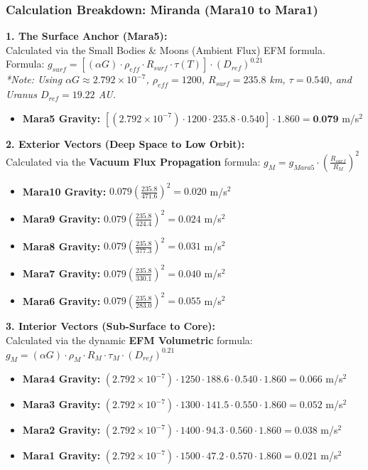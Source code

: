 \documentclass[11pt, a4paper]{article}
\begin{document}
\clearpage
\subsubsection{Calculation Breakdown: Miranda (Mara10 to Mara1)}

\noindent \textbf{1. The Surface Anchor (Mara5):} \\
Calculated via the Small Bodies \& Moons (Ambient Flux) EFM formula. \\
Formula: $g_{surf} = \left[ (\alpha G) \cdot \rho_{eff} \cdot R_{surf} \cdot \tau(T) \right] \cdot (D_{ref})^{0.21}$ \\
\textit{*Note: Using $\alpha G \approx 2.792 \times 10^{-7}$, $\rho_{eff} = 1200$, $R_{surf} = 235.8$ km, $\tau = 0.540$, and Uranus $D_{ref} = 19.22$ AU.}
\begin{itemize}
  \item \textbf{Mara5 Gravity:} $\left[ (2.792 \times 10^{-7}) \cdot 1200 \cdot 235.8 \cdot 0.540 \right] \cdot 1.860 = \textbf{0.079}$ m/s$^2$
\end{itemize}

\vspace{0.5em}
\noindent \textbf{2. Exterior Vectors (Deep Space to Low Orbit):} \\
Calculated via the \textbf{Vacuum Flux Propagation} formula: $g_M = g_{Mara5} \cdot \left( \frac{R_{surf}}{R_M} \right)^2$
\begin{itemize}
  \item \textbf{Mara10 Gravity:} $0.079 \left( \frac{235.8}{471.6} \right)^2 = 0.020$ m/s$^2$
  \item \textbf{Mara9 Gravity:} $0.079 \left( \frac{235.8}{424.4} \right)^2 = 0.024$ m/s$^2$
  \item \textbf{Mara8 Gravity:} $0.079 \left( \frac{235.8}{377.3} \right)^2 = 0.031$ m/s$^2$
  \item \textbf{Mara7 Gravity:} $0.079 \left( \frac{235.8}{330.1} \right)^2 = 0.040$ m/s$^2$
  \item \textbf{Mara6 Gravity:} $0.079 \left( \frac{235.8}{283.0} \right)^2 = 0.055$ m/s$^2$
\end{itemize}

\vspace{0.5em}
\noindent \textbf{3. Interior Vectors (Sub-Surface to Core):} \\
Calculated via the dynamic \textbf{EFM Volumetric} formula: $g_M = (\alpha G) \cdot \rho_{M} \cdot R_M \cdot \tau_M \cdot (D_{ref})^{0.21}$
\begin{itemize}
  \item \textbf{Mara4 Gravity:} $(2.792 \times 10^{-7}) \cdot 1250 \cdot 188.6 \cdot 0.540 \cdot 1.860 = 0.066$ m/s$^2$
  \item \textbf{Mara3 Gravity:} $(2.792 \times 10^{-7}) \cdot 1300 \cdot 141.5 \cdot 0.550 \cdot 1.860 = 0.052$ m/s$^2$
  \item \textbf{Mara2 Gravity:} $(2.792 \times 10^{-7}) \cdot 1400 \cdot 94.3 \cdot 0.560 \cdot 1.860 = 0.038$ m/s$^2$
  \item \textbf{Mara1 Gravity:} $(2.792 \times 10^{-7}) \cdot 1500 \cdot 47.2 \cdot 0.570 \cdot 1.860 = 0.021$ m/s$^2$
\end{itemize}
\end{document}
